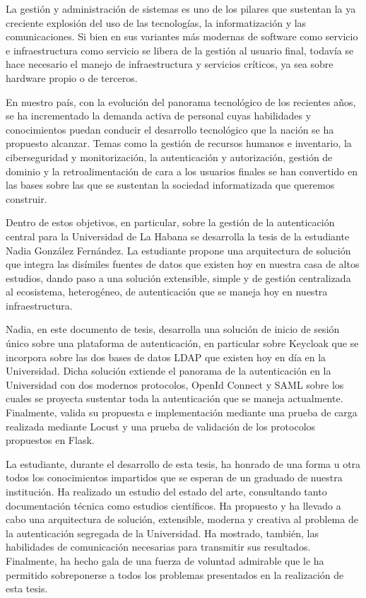 \begin{opinion}
La gestión y administración de sistemas es uno de los pilares que sustentan la ya creciente explosión del uso de las tecnologías, la informatización y las comunicaciones. Si bien en sus variantes más modernas de software como servicio e infraestructura como servicio se libera de la gestión al usuario final, todavía se hace necesario el manejo de infraestructura y servicios críticos, ya sea sobre hardware propio o de terceros.

En nuestro país, con la evolución del panorama tecnológico de los recientes años, se ha incrementado la demanda activa de personal cuyas habilidades y conocimientos puedan conducir el desarrollo tecnológico que la nación se ha propuesto alcanzar. Temas como la gestión de recursos humanos e inventario, la ciberseguridad y monitorización, la autenticación y autorización, gestión de dominio y la retroalimentación de cara a los usuarios finales se han convertido en las bases sobre las que se sustentan la sociedad informatizada que queremos construir. 

Dentro de estos objetivos, en particular, sobre la gestión de la autenticación central para la Universidad de La Habana se desarrolla la tesis de la estudiante Nadia González Fernández. La estudiante propone una arquitectura de solución que integra las disímiles fuentes de datos que existen hoy en nuestra casa de altos estudios, dando paso a una solución extensible, simple y de gestión centralizada al ecosistema, heterogéneo, de autenticación que se maneja hoy en nuestra infraestructura. 

Nadia, en este documento de tesis, desarrolla una solución de inicio de sesión único sobre una plataforma de autenticación, en particular sobre Keycloak que se incorpora sobre las dos bases de datos LDAP que existen hoy en día en la Universidad. Dicha solución extiende el panorama de la autenticación en la Universidad con dos modernos protocolos, OpenId Connect y SAML sobre los cuales se proyecta sustentar toda la autenticación que se maneja actualmente. Finalmente, valida su propuesta e implementación mediante una prueba de carga realizada mediante Locust y una prueba de validación de los protocolos propuestos en Flask.

La estudiante, durante el desarrollo de esta tesis, ha honrado de una forma u otra todos los conocimientos impartidos que se esperan de un graduado de nuestra institución. Ha realizado un estudio del estado del arte, consultando tanto documentación técnica como estudios científicos. Ha propuesto y ha llevado a cabo una arquitectura de solución, extensible, moderna y creativa al problema de la autenticación segregada de la Universidad. Ha mostrado, también, las habilidades de comunicación necesarias para transmitir sus resultados. Finalmente, ha hecho gala de una fuerza de voluntad admirable que le ha permitido sobreponerse a todos los problemas presentados en la realización de esta tesis. 


\end{opinion}
